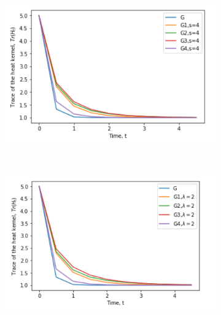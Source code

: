 \documentclass[10pt,a4paper]{article}
\theoremstyle{plain}
\theoremstyle{definition}
\begin{document}
\begin{figure}[H]
\begin{subfigure}[b]{0.45\textwidth}
         		\caption{}
         		\label{completeMellins3}
         	\end{subfigure}~
         	\begin{subfigure}[b]{0.45\textwidth}
         		\includegraphics[width= \textwidth]{images/s4-graphcomp.png}
         		\caption{}
         		\label{completeMellins4}
         	\end{subfigure} \\
            \begin{subfigure}[b]{0.45\textwidth}
            	\includegraphics[width= \textwidth]{images/Laplace-complete-lam2.png}
            	\caption{}
            	\label{completeLaplace2}
            \end{subfigure}~
            \begin{subfigure}[b]{0.45\textwidth}

\end{subfigure}
\end{figure}
\end{document}

